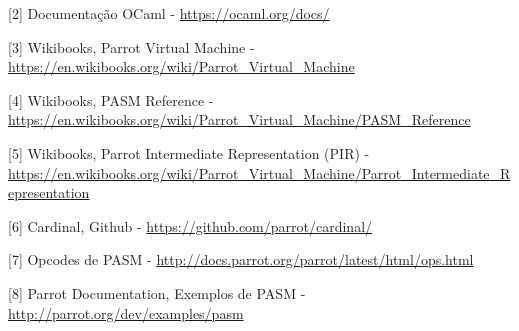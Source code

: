 \documentclass[12pt,a4paper,twoside]{report}
\begin{document}
[2] Documentação OCaml - \url{https://ocaml.org/docs/}

[3] Wikibooks, Parrot Virtual Machine - \url{https://en.wikibooks.org/wiki/Parrot_Virtual_Machine}

[4] Wikibooks, PASM Reference - \url{https://en.wikibooks.org/wiki/Parrot_Virtual_Machine/PASM_Reference}

[5] Wikibooks, Parrot Intermediate Representation (PIR) - \url{https://en.wikibooks.org/wiki/Parrot_Virtual_Machine/Parrot_Intermediate_Representation}

[6] Cardinal, Github - \url{https://github.com/parrot/cardinal/}

[7] Opcodes de PASM - \url{http://docs.parrot.org/parrot/latest/html/ops.html}

[8] Parrot Documentation, Exemplos de PASM - \url{http://parrot.org/dev/examples/pasm}

\clearpage
{}
\appendix
\end{document}
